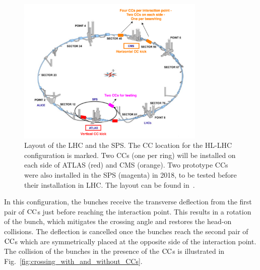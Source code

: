 \begin{figure}[!h] %
    \centering         
    \includegraphics[width=0.8\textwidth]{images/introduction/LHC_layout_CCs.png}
        \caption{Layout of the LHC and the SPS. The CC location for the HL-LHC configuration is marked. Two CCs (one per ring) will be installed on each side of ATLAS (red) and CMS (orange). Two prototype CCs were also installed in the SPS (magenta) in 2018, to be tested before their installation in LHC. The layout can be found in~\cite{LHC_SPS_layout}.}%
        \label{fig:LHC_layout_CCs}
 \end{figure}

In this configuration, the bunches receive the transverse deflection from the first pair of ${\mathrm{CC}}$s just before reaching the interaction point. This results in a rotation of the bunch, which mitigates the crossing angle and restores the head-on collisions. The deflection is cancelled once the bunches reach the second pair of ${\mathrm{CC}}$s which are symmetrically placed at the opposite side of the interaction point. The collision of the bunches in the presence of the ${\mathrm{CC}}$s is illustrated in Fig.~\ref{fig:crossing_with_and_without_CCs}.%

